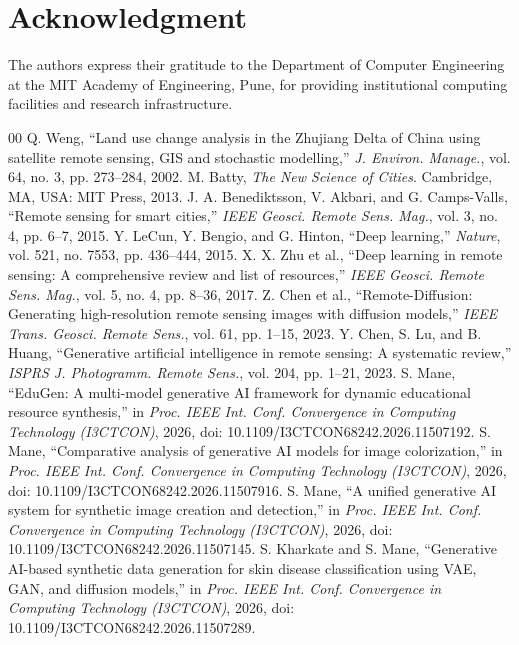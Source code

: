 \documentclass[journal]{IEEEtran}
\begin{document}
\section*{Acknowledgment}
The authors express their gratitude to the Department of Computer Engineering at the MIT Academy of Engineering, Pune, for providing institutional computing facilities and research infrastructure.

\begin{thebibliography}{00}
 Q. Weng, ``Land use change analysis in the Zhujiang Delta of China using satellite remote sensing, GIS and stochastic modelling,'' \textit{J. Environ. Manage.}, vol. 64, no. 3, pp. 273--284, 2002.
 M. Batty, \textit{The New Science of Cities}. Cambridge, MA, USA: MIT Press, 2013.
 J. A. Benediktsson, V. Akbari, and G. Camps-Valls, ``Remote sensing for smart cities,'' \textit{IEEE Geosci. Remote Sens. Mag.}, vol. 3, no. 4, pp. 6--7, 2015.
 Y. LeCun, Y. Bengio, and G. Hinton, ``Deep learning,'' \textit{Nature}, vol. 521, no. 7553, pp. 436--444, 2015.
 X. X. Zhu et al., ``Deep learning in remote sensing: A comprehensive review and list of resources,'' \textit{IEEE Geosci. Remote Sens. Mag.}, vol. 5, no. 4, pp. 8--36, 2017.
 Z. Chen et al., ``Remote-Diffusion: Generating high-resolution remote sensing images with diffusion models,'' \textit{IEEE Trans. Geosci. Remote Sens.}, vol. 61, pp. 1--15, 2023.
 Y. Chen, S. Lu, and B. Huang, ``Generative artificial intelligence in remote sensing: A systematic review,'' \textit{ISPRS J. Photogramm. Remote Sens.}, vol. 204, pp. 1--21, 2023.
 S. Mane, ``EduGen: A multi-model generative AI framework for dynamic educational resource synthesis,'' in \textit{Proc. IEEE Int. Conf. Convergence in Computing Technology (I3CTCON)}, 2026, doi: 10.1109/I3CTCON68242.2026.11507192.
 S. Mane, ``Comparative analysis of generative AI models for image colorization,'' in \textit{Proc. IEEE Int. Conf. Convergence in Computing Technology (I3CTCON)}, 2026, doi: 10.1109/I3CTCON68242.2026.11507916.
 S. Mane, ``A unified generative AI system for synthetic image creation and detection,'' in \textit{Proc. IEEE Int. Conf. Convergence in Computing Technology (I3CTCON)}, 2026, doi: 10.1109/I3CTCON68242.2026.11507145.
 S. Kharkate and S. Mane, ``Generative AI-based synthetic data generation for skin disease classification using VAE, GAN, and diffusion models,'' in \textit{Proc. IEEE Int. Conf. Convergence in Computing Technology (I3CTCON)}, 2026, doi: 10.1109/I3CTCON68242.2026.11507289.

\end{thebibliography}
\end{document}
